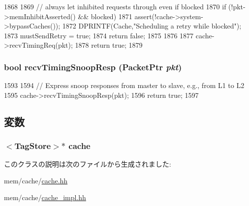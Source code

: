 \begin{DoxyCode}
1868 {
1869     // always let inhibited requests through even if blocked
1870     if (!pkt->memInhibitAsserted() && blocked) {
1871         assert(!cache->system->bypassCaches());
1872         DPRINTF(Cache,"Scheduling a retry while blocked\n");
1873         mustSendRetry = true;
1874         return false;
1875     }
1876 
1877     cache->recvTimingReq(pkt);
1878     return true;
1879 }
\end{DoxyCode}
\hypertarget{classCache_1_1CpuSidePort_a9b643d565edc21dac11ce15a560238a7}{
\subsubsection[{recvTimingSnoopResp}]{\setlength{\rightskip}{0pt plus 5cm}bool recvTimingSnoopResp ({\bf PacketPtr} {\em pkt})}}
\label{classCache_1_1CpuSidePort_a9b643d565edc21dac11ce15a560238a7}



\begin{DoxyCode}
1593 {
1594     // Express snoop responses from master to slave, e.g., from L1 to L2
1595     cache->recvTimingSnoopResp(pkt);
1596     return true;
1597 }
\end{DoxyCode}


\subsection{変数}
\hypertarget{classCache_1_1CpuSidePort_ae1a869e306f5bc5028f706229d68aba1}{
\subsubsection[{cache}]{$<$TagStore$>$$\ast$ {\bf cache}}}
\label{classCache_1_1CpuSidePort_ae1a869e306f5bc5028f706229d68aba1}


このクラスの説明は次のファイルから生成されました:\begin{DoxyCompactItemize}
\item 
mem/cache/\hyperlink{cache_8hh}{cache.hh}\item 
mem/cache/\hyperlink{cache__impl_8hh}{cache\_\-impl.hh}\end{DoxyCompactItemize}
